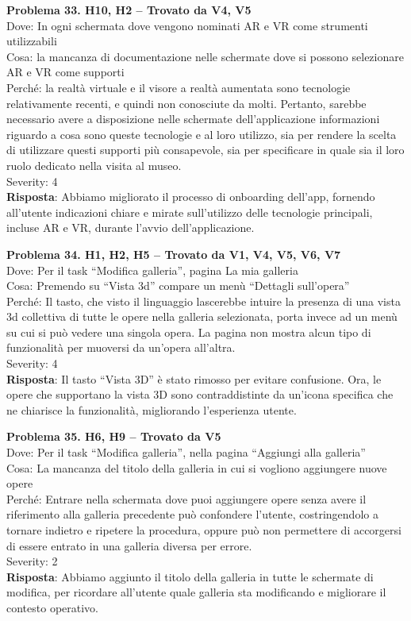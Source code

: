 \documentclass{article}
\begin{document}
\noindent \textbf{Problema 33. H10, H2 – Trovato da V4, V5} \\
Dove: In ogni schermata dove vengono nominati AR e VR come strumenti utilizzabili \\
Cosa: la mancanza di documentazione nelle schermate dove si possono selezionare AR e VR come supporti \\
Perché: la realtà virtuale e il visore a realtà aumentata sono tecnologie relativamente recenti, e quindi non conosciute da molti. Pertanto, sarebbe necessario avere a disposizione nelle schermate dell’applicazione informazioni riguardo a cosa sono queste tecnologie e al loro utilizzo, sia per rendere la scelta di utilizzare questi supporti più consapevole, sia per specificare in quale sia il loro ruolo dedicato nella visita al museo. \\
Severity: 4 \\
\textbf{Risposta}: Abbiamo migliorato il processo di onboarding dell’app, fornendo all’utente indicazioni chiare e mirate sull’utilizzo delle tecnologie principali, incluse AR e VR, durante l’avvio dell’applicazione.

\noindent \textbf{Problema 34. H1, H2, H5 – Trovato da V1, V4, V5, V6, V7} \\
Dove: Per il task “Modifica galleria”, pagina La mia galleria \\
Cosa: Premendo su “Vista 3d” compare un menù “Dettagli sull’opera” \\
Perché: Il tasto, che visto il linguaggio lascerebbe intuire la presenza di una vista 3d collettiva di tutte le opere nella galleria selezionata, porta invece ad un menù su cui si può vedere una singola opera. La pagina non mostra alcun tipo di funzionalità per muoversi da un’opera all’altra. \\
Severity: 4 \\
\textbf{Risposta}: Il tasto “Vista 3D” è stato rimosso per evitare confusione. Ora, le opere che supportano la vista 3D sono contraddistinte da un’icona specifica che ne chiarisce la funzionalità, migliorando l’esperienza utente.

\noindent \textbf{Problema 35. H6, H9 – Trovato da V5} \\
Dove: Per il task “Modifica galleria”, nella pagina “Aggiungi alla galleria” \\
Cosa: La mancanza del titolo della galleria in cui si vogliono aggiungere nuove opere \\
Perché: Entrare nella schermata dove puoi aggiungere opere senza avere il riferimento alla galleria precedente può confondere l’utente, costringendolo a tornare indietro e ripetere la procedura, oppure può non permettere di accorgersi di essere entrato in una galleria diversa per errore. \\
Severity: 2 \\
\textbf{Risposta}: Abbiamo aggiunto il titolo della galleria in tutte le schermate di modifica, per ricordare all’utente quale galleria sta modificando e migliorare il contesto operativo.
\end{document}
